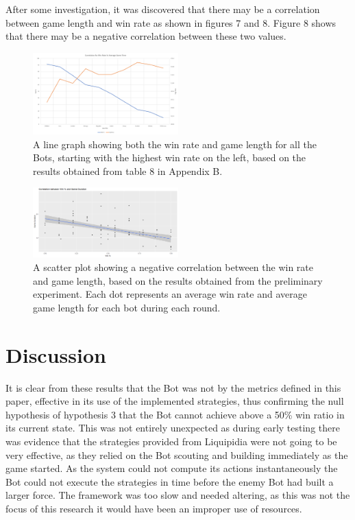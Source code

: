 \documentclass[journal]{IEEEtran}
\begin{document}
	After some investigation, it was discovered that there may be a correlation between game length and win rate as shown in figures 7 and 8. Figure 8 shows that there may be a negative correlation between these two values.
	\begin{figure}
		\centering
		\includegraphics[width=0.5\textwidth]{WinTimeLineWithBot}
		\caption{A line graph showing both the win rate and game length for all the Bots, starting with the highest win rate on the left, based on the results obtained from table 8 in Appendix B.}
		\label{Fig7}
	\end{figure}
	\begin{figure}
		\centering
		\includegraphics[width=0.5\textwidth]{ScatterWinvsDurLine}
		\caption{A scatter plot showing a negative correlation between the win rate and game length, based on the results obtained from the preliminary experiment. Each dot represents an average win rate and average game length for each bot during each round.}
		\label{Fig8}
	\end{figure}
	\section{Discussion}
	It is clear from these results that the Bot was not by the metrics defined in this paper, effective in its use of the implemented strategies, thus confirming the null hypothesis of hypothesis 3 that the Bot cannot achieve above a 50\% win ratio in its current state. This was not entirely unexpected as during early testing there was evidence that the strategies provided from Liquipidia were not going to be very effective, as they relied on the Bot scouting and building immediately as the game started. As the system could not compute its actions instantaneously the Bot could not execute the strategies in time before the enemy Bot had built a larger force. The framework was too slow and needed altering, as this was not the focus of this research it would have been an improper use of resources.
	
\end{document}
